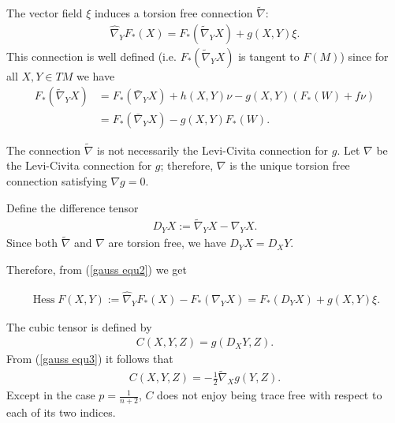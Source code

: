 \documentclass{amsart}
\theoremstyle{definition}
\theoremstyle{remark}
\numberwithin{equation}{section}
\begin{document}
The vector field $\xi$ induces a torsion free connection $\tilde{\nabla}$:
\begin{align}\label{gauss equ2}
\hat{\nabla}_YF_{\ast}(X)=F_{\ast}(\tilde{\nabla}_YX)+g(X,Y)\xi.
\end{align}
This connection is well defined (i.e. $F_{\ast}(\tilde{\nabla}_Y X)$ is tangent to $F(M)$) since for all $X,Y\in TM$ we have
\begin{align}
F_{\ast}(\tilde{\nabla}_Y X) &= F_{\ast}(\bar{\nabla}_Y X) + h(X, Y) \nu - g(X, Y) (F_{\ast}(W) + f \nu) \\
&= F_{\ast}(\bar{\nabla}_YX)-g(X,Y)F_{\ast}(W) \nonumber.
\end{align}

The connection $\tilde{\nabla}$ is not necessarily the Levi-Civita connection for $g$. Let $\nabla$ be the Levi-Civita connection for $g$; therefore, $\nabla$ is the unique torsion free connection satisfying $\nabla g=0.$

Define the difference tensor
\begin{align*}
D_YX:=\tilde{\nabla}_{Y}X-\nabla_{Y}X.
\end{align*}
Since both $\tilde{\nabla}$ and $\nabla$ are torsion free, we have $D_YX=D_XY.$

Therefore, from (\ref{gauss equ2}) we get

\begin{align}\label{gauss equ3}
\operatorname{Hess}F(X,Y):=\hat{\nabla}_YF_{\ast}(X)-F_{\ast}(\nabla_YX)=F_{\ast}(D_YX)+g(X,Y)\xi.
\end{align}

The cubic tensor is defined by
\begin{align}
C(X,Y,Z)=g(D_XY,Z).
\end{align}
From (\ref{gauss equ3}) it follows that
\begin{align}
C(X,Y,Z)
=-\frac{1}{2}\tilde{\nabla}_Xg(Y,Z).
\end{align}
Except in the case $ p =\frac{1}{n+2}$, $ C$ does not enjoy being trace free with respect to each of its two indices.
\end{document}
